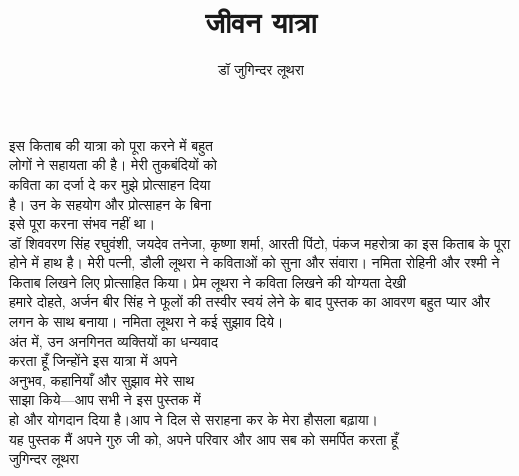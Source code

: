 \documentclass{memoir}
\begin{document}
\title{\Huge \texthindi{जीवन यात्रा}}
\author{\huge \texthindi{डॉ जुगिन्दर लूथरा}}
\maketitle
\frontmatter
\tableofcontents
\texthindi{
इस किताब की यात्रा को पूरा करने में बहुत\\
लोगों ने सहायता की है। मेरी तुकबंदियों को\\
कविता का दर्जा दे कर मुझे प्रोत्साहन दिया\\
है। उन के सहयोग और प्रोत्साहन के बिना\\
इसे पूरा करना संभव नहीं था।\\
डॉ शिववरण सिंह रघुवंशी, जयदेव तनेजा, कृष्णा शर्मा, आरती पिंटो, पंकज महरोत्रा का इस किताब के पूरा होने में हाथ है। मेरी पत्नी, डौली लूथरा ने कविताओं को सुना और संवारा। नमिता रोहिनी और रश्मी ने किताब लिखने लिए प्रोत्साहित किया। प्रेम लूथरा ने कविता लिखने की योग्यता देखी \\
हमारे दोहते, अर्जन बीर सिंह ने फूलों की तस्वीर स्वयं लेने के बाद पुस्तक का आवरण बहुत प्यार और लगन के साथ बनाया। नमिता लूथरा ने कई सुझाव दिये। \\
अंत में, उन अनगिनत व्यक्तियों का धन्यवाद\\
करता हूँ जिन्होंने इस यात्रा में अपने\\
अनुभव, कहानियाँ और सुझाव मेरे साथ\\
साझा किये—आप सभी ने इस पुस्तक में\\
हो और योगदान दिया है।आप ने दिल से सराहना कर के मेरा हौसला बढ़ाया।\\
यह पुस्तक मैं अपने गुरु जी को, अपने परिवार और आप सब को समर्पित करता हूँ\\
जुगिन्दर लूथरा
}

\mainmatter

\end{document}
